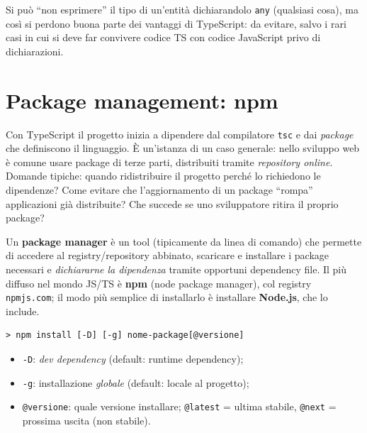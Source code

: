 \begin{attenzione}
Si pu\`o ``non esprimere'' il tipo di un'entit\`a dichiarandolo \texttt{any} (qualsiasi cosa),
ma cos\`i si perdono buona parte dei vantaggi di TypeScript: da evitare, salvo i rari casi in
cui si deve far convivere codice TS con codice JavaScript privo di dichiarazioni.
\end{attenzione}

\section{Package management: npm}

Con TypeScript il progetto inizia a dipendere dal compilatore \texttt{tsc} e dai
\emph{package} che definiscono il linguaggio. \`E un'istanza di un caso generale: nello
sviluppo web \`e comune usare package di terze parti, distribuiti tramite \emph{repository
online}. Domande tipiche: quando ridistribuire il progetto perch\'e lo richiedono le
dipendenze? Come evitare che l'aggiornamento di un package ``rompa'' applicazioni gi\`a
distribuite? Che succede se uno sviluppatore ritira il proprio package?

\begin{definizione}
Un \textbf{package manager} \`e un tool (tipicamente da linea di comando) che permette di
accedere al registry/repository abbinato, scaricare e installare i package necessari e
\emph{dichiararne la dipendenza} tramite opportuni dependency file. Il pi\`u diffuso nel
mondo JS/TS \`e \textbf{npm} (node package manager), col registry \texttt{npmjs.com};
il modo pi\`u semplice di installarlo \`e installare \textbf{Node.js}, che lo include.
\end{definizione}

\begin{lstlisting}
> npm install [-D] [-g] nome-package[@versione]
\end{lstlisting}
\begin{itemize}
  \item \texttt{-D}: \emph{dev dependency} (default: runtime dependency);
  \item \texttt{-g}: installazione \emph{globale} (default: locale al progetto);
  \item \texttt{@versione}: quale versione installare; \texttt{@latest} = ultima stabile,
        \texttt{@next} = prossima uscita (non stabile).
\end{itemize}

